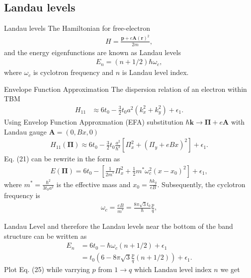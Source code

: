 \documentclass[aspectratio=169,compress,x11names]{beamer}
\begin{document}
	\subsection{Landau levels}
	\begin{frame}{Landau levels}
		The Hamiltonian for free-electron
		\begin{gather}
			H = \frac{\mathbf{p} + e \mathbf{A}(\mathbf{r})^{2}}{2m} ,
		\end{gather}
		and the energy eigenfunctions are known as Landau levels
		\begin{gather}
			E_{n} = \left(n + 1/2\right) \hbar \omega_{c},
		\end{gather}
		where $\omega_{c}$ is cyclotron frequency and $n$ is Landau level index.
	\end{frame}
	\begin{frame}{Envelope Function Approximation}
		The dispersion relation of an electron within TBM
		\begin{equation}
			\begin{aligned}
				H_{11} 
				& \approx 6 t_{0} - \frac{3}{2} t_{0} a^{2} (k_{x}^{2} + k_{y}^{2}) + \epsilon_{1}.
			\end{aligned}
		\end{equation}
		Using Envelop Function Approxmation (EFA) substitution $\hbar\mathbf{k} \to \mathbf{\Pi} + e \mathbf{A}$ with Landau gauge $\mathbf{A} = (0,Bx,0)$
		\begin{gather}
			H_{11}(\mathbf{\Pi})
			\approx 6 t_{0} - \frac{3}{2} t_{0} \frac{a^{2}}{\hbar^{2}} \left[ \Pi_{x}^{2} + \left(\Pi_{y} + e B x\right)^{2}\right] + \epsilon_{1}.
		\end{gather}
		Eq. (21) can be rewrite in the form as 
		\begin{gather}
			E(\mathbf{\Pi}) = 6 t_{0} - \left[\frac{1}{2m^{*}} \Pi_{x}^{2} + \frac{1}{2} m^{*} \omega_{c}^{2}(x - x_{0})^{2}\right] + \epsilon_{1},
		\end{gather}
		where $m^{*} = \frac{\hbar^{2}}{3t_{0}a^{2}}$ is the effective mass and $x_{0} = \frac{\hbar k_{y}}{eB}$. Subsequently, the cyclotron frequency is
		\begin{gather}
			\omega_{c} = \frac{eB}{m^{*}} = \frac{8 \pi \sqrt{3} t_{0}}{\hbar}  \frac{p}{q},
		\end{gather}
	\end{frame}
	\begin{frame}{Landau Level}
		and therefore the Landau levels near the bottom of the band structure can be written as
		\begin{equation}
			\begin{aligned}
				E_{n}
				& = 6 t_{0} - \hbar \omega_{c} (n + 1 /2) + \epsilon_{1}                    \\
				& = t_{0} \left(6 - 8\pi\sqrt{3} \frac{p}{q}( n + 1 /2)\right) + \epsilon_{1}.
			\end{aligned}
		\end{equation}
		Plot Eq. (25) while varrying $p$ from $1\to q$ which Landau level index $n$ we get
	\end{frame}
\end{document}
